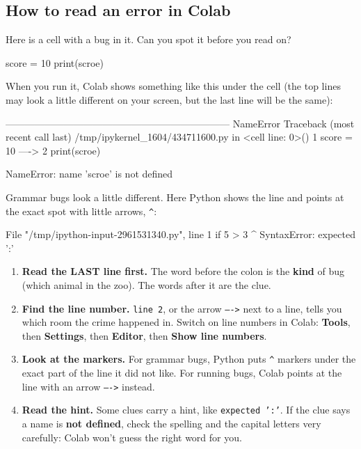 \subsection*{How to read an error in Colab}

Here is a cell with a bug in it. Can you spot it before you read on?

\begin{code}
score = 10
print(scroe)
\end{code}

When you run it, Colab shows something like this under the cell (the top lines may look a little different on your screen, but the last line will be the same):

\begin{bzcolab}
---------------------------------------------------------------------
NameError                         Traceback (most recent call last)
/tmp/ipykernel_1604/434711600.py in <cell line: 0>()
      1 score = 10
----> 2 print(scroe)

NameError: name 'scroe' is not defined
\end{bzcolab}

Grammar bugs look a little different. Here Python shows the line and points at the exact spot with little arrows, \texttt{\textasciicircum}:

\begin{bzcolab}
  File "/tmp/ipython-input-2961531340.py", line 1
    if 5 > 3
            ^
SyntaxError: expected ':'
\end{bzcolab}

\begin{tcolorbox}[enhanced, colback=errbg, colframe=errframe, boxrule=0.8pt, arc=6pt,
  title={\textbf{The Detective's Routine}}, coltitle=white, colbacktitle=errframe]
\begin{enumerate}[leftmargin=*]
  \item \textbf{Read the LAST line first.} The word before the colon is the \textbf{kind} of bug (which animal in the zoo). The words after it are the clue.
  \item \textbf{Find the line number.} \texttt{line 2}, or the arrow \texttt{---->} next to a line, tells you which room the crime happened in. Switch on line numbers in Colab: \textbf{Tools}, then \textbf{Settings}, then \textbf{Editor}, then \textbf{Show line numbers}.
  \item \textbf{Look at the markers.} For grammar bugs, Python puts \texttt{\textasciicircum} markers under the exact part of the line it did not like. For running bugs, Colab points at the line with an arrow \texttt{---->} instead.
  \item \textbf{Read the hint.} Some clues carry a hint, like \texttt{expected ':'}. If the clue says a name is \textbf{not defined}, check the spelling and the capital letters very carefully: Colab won't guess the right word for you.
\end{enumerate}
\end{tcolorbox}

